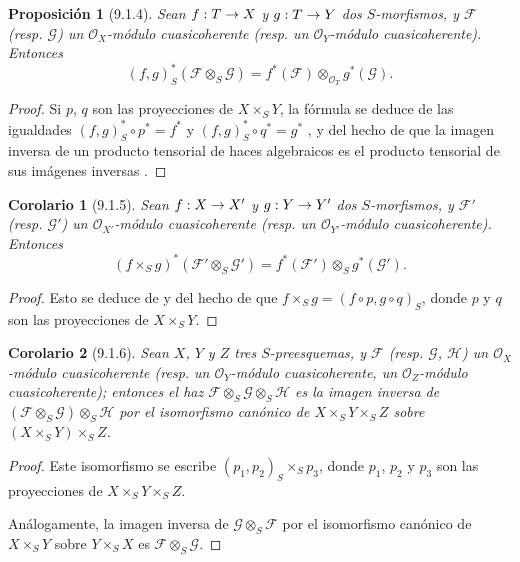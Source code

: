 \documentclass[oneside]{amsart}
\theoremstyle{ega-env-style}
\theoremstyle{ega-thm-env-style}
\newtheorem*{proposition}{Proposición}
\newtheorem*{corollary}{Corolario}
\theoremstyle{ega-defn-env-style}
\renewcommand{\to}{\mathchoice{\longrightarrow}{\rightarrow}{\rightarrow}{\rightarrow}}
\let\EGAOriginalLabel\label
\renewcommand{\label}[1]{\phantomsection\EGAOriginalLabel{#1}}
\begin{document}
\begin{proposition}[9.1.4]
\label{I.9.1.4}
Sean $f:T\to X$ y $g:T\to Y$ dos $S$-morfismos, y $\mathscr{F}$ \textup{(resp. $\mathscr{G}$)} un $\mathscr{O}_X$-módulo cuasicoherente \textup{(resp.} un $\mathscr{O}_Y$-módulo cuasicoherente).
Entonces
\[
  (f,g)_S^*(\mathscr{F}\otimes_S\mathscr{G})
  =f^*(\mathscr{F})\otimes_{\mathscr{O}_T}g^*(\mathscr{G}).
\]
\end{proposition}

\begin{proof}
Si $p$, $q$ son las proyecciones de $X\times_S Y$, la fórmula se deduce
de las igualdades $(f,g)_S^*\circ p^*=f^*$ y
$(f,g)_S^*\circ q^*=g^*$ , y del hecho de que la imagen
inversa de un producto tensorial de haces algebraicos es el producto tensorial de sus imágenes
inversas .
\end{proof}

\begin{corollary}[9.1.5]
\label{I.9.1.5}
Sean $f:X\to X'$ y $g:Y\to Y'$
dos $S$-morfismos, y $\mathscr{F}'$ \textup{(resp. $\mathscr{G}'$)} un
$\mathscr{O}_{X'}$-módulo cuasicoherente \textup{(resp.} un $\mathscr{O}_{Y'}$-módulo cuasicoherente). Entonces
\[
  (f\times_S g)^*(\mathscr{F}'\otimes_S\mathscr{G}')
  =f^*(\mathscr{F}')\otimes_S g^*(\mathscr{G}').
\]
\end{corollary}

\begin{proof}
Esto se deduce de  y del hecho de que $f\times_S g=(f\circ p,g\circ q)_S$,
donde $p$ y $q$ son las proyecciones de $X\times_S Y$.
\end{proof}

\begin{corollary}[9.1.6]
\label{I.9.1.6}
Sean $X$, $Y$ y $Z$ tres $S$-preesquemas, y $\mathscr{F}$ \textup{(resp. $\mathscr{G}$, $\mathscr{H}$)} un
$\mathscr{O}_X$-módulo cuasicoherente \textup{(resp.} un $\mathscr{O}_Y$-módulo cuasicoherente, un
$\mathscr{O}_Z$-módulo cuasicoherente); entonces el haz $\mathscr{F}\otimes_S\mathscr{G}\otimes_S\mathscr{H}$ es la imagen inversa
de $(\mathscr{F}\otimes_S\mathscr{G})\otimes_S\mathscr{H}$ por el isomorfismo canónico de
$X\times_S Y\times_S Z$ sobre $(X\times_S Y)\times_S Z$.
\end{corollary}

\begin{proof}
Este isomorfismo se escribe $(p_1,p_2)_S\times_S p_3$, donde $p_1$, $p_2$ y $p_3$
son las proyecciones de $X\times_S Y\times_S Z$.

Análogamente, la imagen inversa de $\mathscr{G}\otimes_S\mathscr{F}$ por el isomorfismo canónico de
$X\times_S Y$ sobre $Y\times_S X$ es $\mathscr{F}\otimes_S\mathscr{G}$.
\end{proof}
\end{document}
